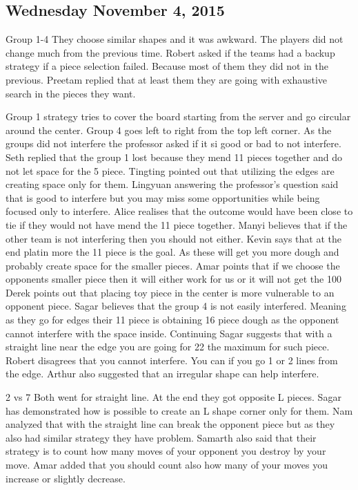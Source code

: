\subsection{Wednesday November 4, 2015}
Group 1-4
They choose similar shapes and it was awkward.
The players did not change much from the previous time.
Robert asked if the teams had a backup strategy if a piece selection failed. Because most of them they did not in the previous.
Preetam replied that at least them they are going with exhaustive search in the pieces they want.

Group 1 strategy tries to cover the board starting from the server and go circular around the center.
Group 4 goes left to right from the top left corner.
As the groups did not interfere the professor asked if it si good or bad to not interfere.
Seth replied that the group 1 lost because they mend 11 pieces together and do not let space for the 5 piece.
Tingting pointed out that utilizing the edges are creating space only for them.
Lingyuan answering the professor’s question said that is good to interfere but you may miss some opportunities while being focused only to interfere. 
Alice realises that the outcome would have been close to tie if they would not have mend the 11 piece together.
Manyi believes that if the other team is not interfering then you should not either.
Kevin says that at the end platin more the 11 piece is the goal. As these will get you more dough and probably create space for the smaller pieces.
Amar points that if we choose the opponents smaller piece then it will either work for us or it will not get the 100%
Derek points out that placing toy piece in the center is more vulnerable to an opponent piece.
Sagar believes that the group 4 is not easily interfered.  Meaning as they go for edges their 11 piece is obtaining 16 piece dough as the opponent cannot interfere with the space inside.
Continuing Sagar suggests that with a straight line near the edge you are going for 22 the maximum for such piece.
Robert disagrees that you cannot interfere. You can if you go 1 or 2 lines from the edge.
Arthur also suggested that an irregular shape can help interfere. 

2 vs 7
Both went for straight line. At the end they got opposite L pieces.
Sagar has demonstrated how is possible to create an L shape corner only for them.
Nam analyzed that with the straight line can break the opponent piece but as they also had similar strategy they have problem.
Samarth also said that their strategy is to count how many moves of your opponent you destroy by your move.
Amar added that you should count also how many of your moves you increase or slightly decrease.


